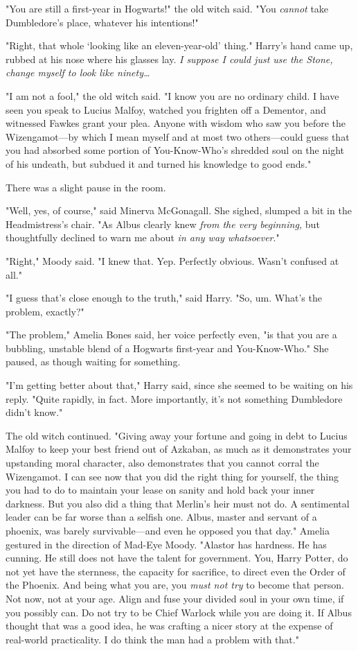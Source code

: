 "You are still a first-year in Hogwarts!" the old witch said. "You
\emph{cannot} take Dumbledore's place, whatever his intentions!"

"Right, that whole `looking like an eleven-year-old' thing." Harry's hand came
up, rubbed at his nose where his glasses lay. \emph{I suppose I could just use
the Stone, change myself to look like ninety…}

"I am not a fool," the old witch said. "I know you are no ordinary child. I
have seen you speak to Lucius Malfoy, watched you frighten off a Dementor, and
witnessed Fawkes grant your plea. Anyone with wisdom who saw you before the
Wizengamot---by which I mean myself and at most two others---could guess that
you had absorbed some portion of You-Know-Who's shredded soul on the night of
his undeath, but subdued it and turned his knowledge to good ends."

There was a slight pause in the room.

"Well, yes, of course," said Minerva McGonagall. She sighed, slumped a bit in
the Headmistress's chair. "As Albus clearly knew \emph{from the very
beginning,} but thoughtfully declined to warn me about \emph{in any way
whatsoever}."

"Right," Moody said. "I knew that. Yep. Perfectly obvious. Wasn't confused at
all."

"I guess that's close enough to the truth," said Harry. "So, um. What's the
problem, exactly?"

"The problem," Amelia Bones said, her voice perfectly even, "is that you are a
bubbling, unstable blend of a Hogwarts first-year and You-Know-Who." She
paused, as though waiting for something.

"I'm getting better about that," Harry said, since she seemed to be waiting on
his reply. "Quite rapidly, in fact. More importantly, it's not something
Dumbledore didn't know."

The old witch continued. "Giving away your fortune and going in debt to Lucius
Malfoy to keep your best friend out of Azkaban, as much as it demonstrates your
upstanding moral character, also demonstrates that you cannot corral the
Wizengamot. I can see now that you did the right thing for yourself, the thing
you had to do to maintain your lease on sanity and hold back your inner
darkness. But you also did a thing that Merlin's heir must not do. A
sentimental leader can be far worse than a selfish one. Albus, master and
servant of a phoenix, was barely survivable---and even he opposed you that
day." Amelia gestured in the direction of Mad-Eye Moody. "Alastor has hardness.
He has cunning. He still does not have the talent for government. You, Harry
Potter, do not yet have the sternness, the capacity for sacrifice, to direct
even the Order of the Phoenix. And being what you are, you \emph{must not try}
to become that person. Not now, not at your age. Align and fuse your divided
soul in your own time, if you possibly can. Do not try to be Chief Warlock
while you are doing it. If Albus thought that was a good idea, he was crafting
a nicer story at the expense of real-world practicality. I do think the man had
a problem with that."

